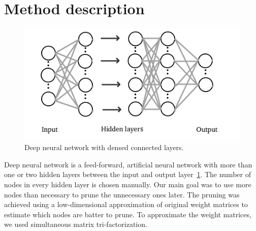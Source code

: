 \documentclass{article} %
\begin{document}


\section{Method description}

\begin{figure}[!ht]
\centering
\includegraphics[width=.6\textwidth]{globokamreza2.jpg}
\caption{Deep neural network with densed connected layers.}
\label{f:globokamreza}
\end{figure}

Deep neural network is a feed-forward, artificial neural network with more than
one or two hidden layers between the input and output
layer~\ref{f:globokamreza}. The number of nodes in every hidden layer is chosen
manually. Our main goal was to use more nodes than necessary to prune the
unnecessary ones later. The pruning was achieved using a low-dimensional
approximation of original weight matrices to estimate which nodes are batter to
prune. To approximate the weight matrices, we used simultaneous matrix
tri-factorization.
\end{document}
